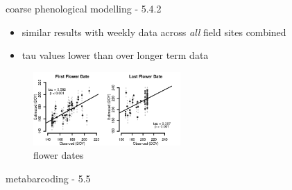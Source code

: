 \documentclass[
  ignorenonframetext,
]{beamer}
\providecommand{\tightlist}{%
  \setlength{\itemsep}{0pt}\setlength{\parskip}{0pt}}
\begin{document}
\begin{frame}{coarse phenological modelling - 5.4.2}
\protect\hypertarget{coarse-phenological-modelling---5.4.2}{}
\begin{itemize}
\tightlist
\item
  similar results with weekly data across \emph{all} field sites
  combined
\item
  tau values lower than over longer term data
\end{itemize}

\begin{figure}
\centering
\includegraphics[width=0.5\textwidth,height=\textheight]{../graphics/plots/phenology_estimates-jeo_10_90.png}
\caption{flower dates}
\end{figure}

\end{frame}

\begin{frame}{metabarcoding - 5.5}
\protect\hypertarget{metabarcoding---5.5}{}
\end{frame}
\end{document}
